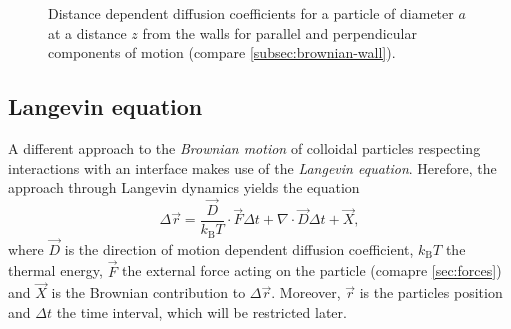 \documentclass[.../bericht]{subfilies}
\begin{document}
         \begin{figure}
           \centering
           \caption{Distance dependent diffusion coefficients for a particle of diameter $a$ at a distance $z$ from the walls for parallel and perpendicular components of motion (compare \cref{subsec:brownian-wall}).}
           \label{fig:D-wall}
         \end{figure}


        \subsection{Langevin equation}

          A different approach to the \textit{Brownian motion} of colloidal particles respecting interactions with an interface makes use of the \textit{Langevin equation}. Herefore, the approach through  Langevin dynamics yields the equation
          \begin{equation*}
            \Delta \vec{r}=\frac{\vec{D}}{k_\mathrm{B}T}\cdot \vec{F}\Delta t+ \nabla \cdot \vec{D}\Delta t + \vec{X},
          \end{equation*}
          where $\vec{D}$ is the direction of motion dependent diffusion coefficient, $k_\mathrm{B}T$ the thermal energy, $\vec{F}$ the external force acting on the particle (comapre \cref{sec:forces}) and $\vec{X}$ is the Brownian contribution to $\Delta \vec{r}$. Moreover, $\vec{r}$ is the particles position and $\Delta t$ the time interval, which will be restricted later.
\end{document}
